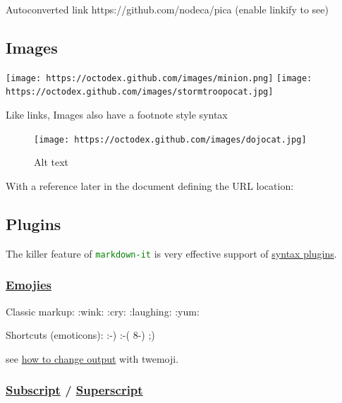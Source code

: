 \documentclass[
  paper=a4,
  ,captions=tableheading
]{scrartcl}
\renewenvironment{quote}{\begin{customblockquote}\list{}{\rightmargin=0em\leftmargin=0em}%
\item\relax\color{blockquote-text}\ignorespaces}{\unskip\unskip\endlist\end{customblockquote}}
\begin{document}
Autoconverted link https://github.com/nodeca/pica (enable linkify to
see)

\hypertarget{images}{%
\subsection{Images}\label{images}}

\texttt{[image: https://octodex.github.com/images/minion.png]}
\texttt{[image: https://octodex.github.com/images/stormtroopocat.jpg]}

Like links, Images also have a footnote style syntax

\begin{figure}
\centering
\texttt{[image: https://octodex.github.com/images/dojocat.jpg]}
\caption{Alt text}
\end{figure}

With a reference later in the document defining the URL location:

\hypertarget{plugins}{%
\subsection{Plugins}\label{plugins}}

The killer feature of \textcolor{green}{\lstinline{markdown-it}} is very
effective support of
\href{https://www.npmjs.org/browse/keyword/markdown-it-plugin}{syntax
plugins}.

\hypertarget{emojies}{%
\subsubsection{\texorpdfstring{\href{https://github.com/markdown-it/markdown-it-emoji}{Emojies}}{Emojies}}\label{emojies}}

\begin{quote}
Classic markup: :wink: :cry: :laughing: :yum:

Shortcuts (emoticons): :-) :-( 8-) ;)
\end{quote}

see
\href{https://github.com/markdown-it/markdown-it-emoji\#change-output}{how
to change output} with twemoji.

\hypertarget{subscript-superscript}{%
\subsubsection{\texorpdfstring{\href{https://github.com/markdown-it/markdown-it-sub}{Subscript}
/
\href{https://github.com/markdown-it/markdown-it-sup}{Superscript}}{Subscript / Superscript}}\label{subscript-superscript}}
\end{document}
